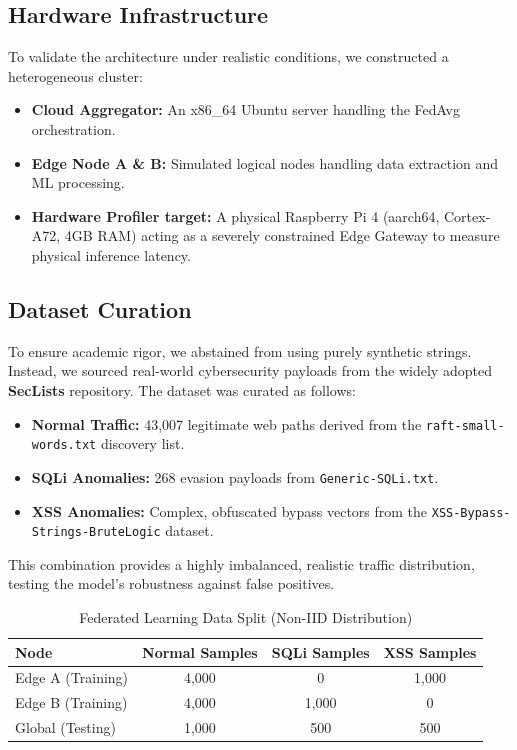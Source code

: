\documentclass[conference]{IEEEtran}
\begin{document}
\subsection{Hardware Infrastructure}
To validate the architecture under realistic conditions, we constructed a heterogeneous cluster:
\begin{itemize}
    \item \textbf{Cloud Aggregator:} An x86\_64 Ubuntu server handling the FedAvg orchestration.
    \item \textbf{Edge Node A \& B:} Simulated logical nodes handling data extraction and ML processing.
    \item \textbf{Hardware Profiler target:} A physical Raspberry Pi 4 (aarch64, Cortex-A72, 4GB RAM) acting as a severely constrained Edge Gateway to measure physical inference latency.
\end{itemize}

\subsection{Dataset Curation}
To ensure academic rigor, we abstained from using purely synthetic strings. Instead, we sourced real-world cybersecurity payloads from the widely adopted \textbf{SecLists} repository. 
The dataset was curated as follows:
\begin{itemize}
    \item \textbf{Normal Traffic:} 43,007 legitimate web paths derived from the \texttt{raft-small-words.txt} discovery list.
    \item \textbf{SQLi Anomalies:} 268 evasion payloads from \texttt{Generic-SQLi.txt}.
    \item \textbf{XSS Anomalies:} Complex, obfuscated bypass vectors from the \texttt{XSS-Bypass-Strings-BruteLogic} dataset.
\end{itemize}
This combination provides a highly imbalanced, realistic traffic distribution, testing the model's robustness against false positives.

\begin{table}[htbp]
\centering
\caption{Federated Learning Data Split (Non-IID Distribution)}
\begin{tabular}{@{}lccc@{}}
\toprule
\textbf{Node} & \textbf{Normal Samples} & \textbf{SQLi Samples} & \textbf{XSS Samples} \\ \midrule
Edge A (Training)      & 4,000                   & 0                     & 1,000                \\
Edge B (Training)      & 4,000                   & 1,000                 & 0                    \\
Global (Testing)       & 1,000                   & 500                   & 500                  \\ \bottomrule
\end{tabular}
\end{table}
\end{document}
